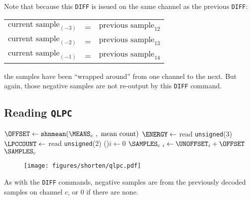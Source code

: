 \par
\noindent
Note that because this \texttt{DIFF} is issued on the same channel
as the previous \texttt{DIFF}:
\begin{table}[h]
\begin{tabular}{rcl}
  $\text{current sample}_{(-3)}$ & = & $\text{previous sample}_{12}$ \\
  $\text{current sample}_{(-2)}$ & = & $\text{previous sample}_{13}$ \\
  $\text{current sample}_{(-1)}$ & = & $\text{previous sample}_{14}$ \\
\end{tabular}
\end{table}
\par
\noindent
the samples have been ``wrapped around'' from one channel to the next.
But again, those negative samples are not re-output by
this \texttt{DIFF} command.

\clearpage

\subsection{Reading \texttt{QLPC}}
{
$\text{\OFFSET} \leftarrow \texttt{shnmean}(\text{\MEANS}_c~,~\text{mean count})$\;
$\ENERGY \leftarrow$ read \texttt{unsigned}(3)\;
$\LPCCOUNT \leftarrow$ read \texttt{unsigned}(2)\;
\For(){$i \leftarrow 0$ \emph{\KwTo}\BLOCKLENGTH}{
  $\text{\SAMPLES}_{c~i} \leftarrow \text{\UNOFFSET}_i + \OFFSET$
}
\Return $\text{\SAMPLES}_c$\;
\EALGORITHM
}
\begin{figure}[h]
\texttt{[image: figures/shorten/qlpc.pdf]}
\end{figure}
\par
\noindent
As with the \texttt{DIFF} commands, negative samples are from the
previously decoded samples on channel $c$, or 0 if there are none.

